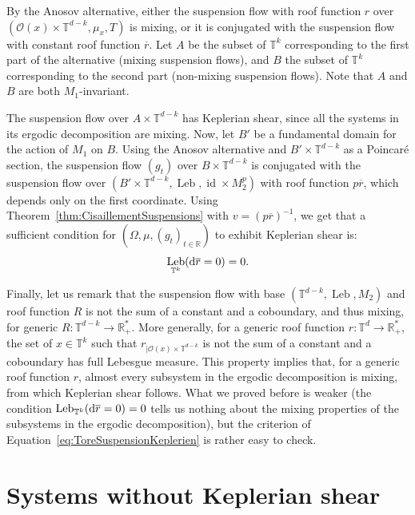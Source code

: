 \documentclass[10pt]{amsart}
\theoremstyle{definition}\newtheorem{defi}[theo]{Definition}\newtheorem{rema}[theo]{Remark}\newtheorem{exam}[theo]{Example}\newtheorem{exem}[theo]{Example}\newtheorem{nota}[theo]{Notation}
\DeclareMathOperator{\id}{id}
\DeclareMathOperator{\Leb}{Leb}
\newcommand{\R}{\mathbb{R}}
\newcommand{\Tbb}{\mathbb{T}}
\newcommand{\Ocal}{\mathcal{O}}
\newcommand{\de}{{\rm d}}
\begin{document}

By the Anosov alternative, either the suspension flow with roof function $r$ over $(\Ocal (x) \times \Tbb^{d-k}, \mu_x, T)$ is mixing, or it is conjugated with the suspension flow with constant roof function $\overline{r}$. Let $A$ be the subset of $\Tbb^k$ corresponding to the first part of the alternative (mixing suspension flows), and $B$ the subset of $\Tbb^k$ corresponding to the second part (non-mixing suspension flows). Note that $A$ and $B$ are both $M_1$-invariant.


The suspension flow over $A \times \Tbb^{d-k}$ has Keplerian shear, since all the systems in its ergodic decomposition are mixing. Now, let $B'$ be a fundamental domain for the action of $M_1$ on $B$. Using the Anosov alternative and $B' \times \Tbb^{d-k}$ as a Poincaré section, the suspension flow $(g_t)$ over $B \times \Tbb^{d-k}$ is conjugated with the suspension flow over $(B' \times \Tbb^{d-k}, \Leb, \id \times M_2^p)$ with roof function $p \overline{r}$, which depends only on the first coordinate. Using Theorem~\ref{thm:CisaillementSuspensions} with $v = (p \overline{r})^{-1}$, we get that a sufficient condition for $(\Omega, \mu, (g_t)_{t \in \R})$ to exhibit Keplerian shear is:
\begin{equation}\label{eq:ToreSuspensionKeplerien}
\Leb_{\Tbb^k} (\de \overline{r} = 0) = 0.
\end{equation}

Finally, let us remark that the suspension flow with base $(\Tbb^{d-k}, \Leb, M_2)$ and roof function $R$ is not the sum of a constant and a coboundary, and thus mixing, for generic $R : \Tbb^{d-k} \to \R_+^*$. More generally, for a generic roof function $r : \Tbb^d \to \R_+^*$, the set of $x \in \Tbb^k$ such that $r_{|\Ocal(x)\times \Tbb^{d-k}}$ is not the sum of a constant and a coboundary has full Lebesgue measure. This property implies that, for a generic roof function $r$, almost every subsystem in the ergodic decomposition is mixing, from which Keplerian shear follows. What we proved before is weaker (the condition $\Leb_{\Tbb^k} (\de \overline{r} = 0) = 0$ tells us nothing about the mixing properties of the subsystems in the ergodic decomposition), but the criterion of Equation~\eqref{eq:ToreSuspensionKeplerien} is rather easy to check.


\section{Systems without Keplerian shear}\label{sec:SansMelange}
\end{document}
